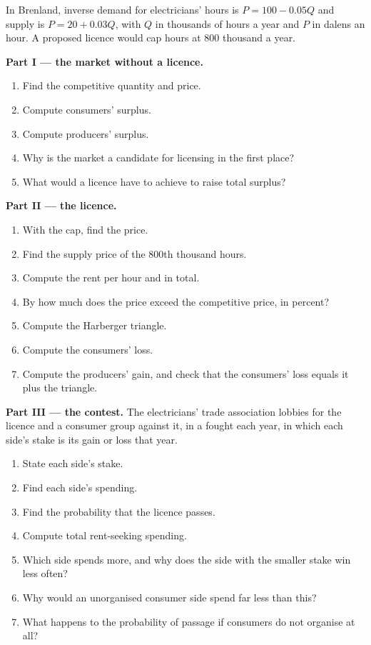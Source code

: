 \begin{problem}\label{pb:b3:interest-groups-and-regulation:electricians}
In Brenland, inverse demand for electricians' hours is $P = 100 - 0.05Q$ and supply is
$P = 20 + 0.03Q$, with $Q$ in thousands of hours a year and $P$ in dalens an hour. A proposed
licence would cap hours at 800 thousand a year. %

\medskip\noindent\textbf{Part I --- the market without a licence.}
\begin{enumerate}
\item Find the competitive quantity and price.
\item Compute consumers' surplus.
\item Compute producers' surplus.
\item Why is the market a candidate for licensing in the first place?
\item What would a licence have to achieve to raise total surplus?
\end{enumerate}

\medskip\noindent\textbf{Part II --- the licence.}
\begin{enumerate}[resume]
\item With the cap, find the price.
\item Find the supply price of the 800th thousand hours.
\item Compute the rent per hour and in total.
\item By how much does the price exceed the competitive price, in percent?
\item Compute the Harberger triangle.
\item Compute the consumers' loss.
\item Compute the producers' gain, and check that the consumers' loss equals it plus
the triangle.
\end{enumerate}

\medskip\noindent\textbf{Part III --- the contest.} The electricians' trade association
lobbies for the licence and a consumer group against it, in a 
fought each year, in which each side's stake is its gain or loss that year.
\begin{enumerate}[resume]
\item State each side's stake.
\item Find each side's spending.
\item Find the probability that the licence passes.
\item Compute total rent-seeking spending.
\item Which side spends more, and why does the side with the smaller stake win less
often?
\item Why would an unorganised consumer side spend far less than this?
\item What happens to the probability of passage if consumers do not organise at all?
\end{enumerate}


\end{problem}
